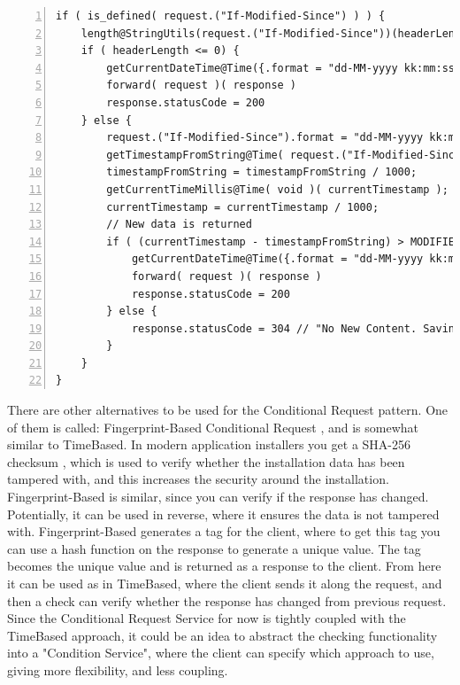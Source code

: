 \documentclass[12pt]{article}
\begin{document}
\begin{lstlisting}[caption=Courier operations for the Conditional Request service, 
    captionpos=b, label={lst:condreqCourier}, frame=single, breaklines=true, numbers=left, basicstyle=\scriptsize]
if ( is_defined( request.("If-Modified-Since") ) ) {
    length@StringUtils(request.("If-Modified-Since"))(headerLength);
    if ( headerLength <= 0) {
        getCurrentDateTime@Time({.format = "dd-MM-yyyy kk:mm:ss"})(lastModified);
        forward( request )( response )
        response.statusCode = 200
    } else {
        request.("If-Modified-Since").format = "dd-MM-yyyy kk:mm:ss";
        getTimestampFromString@Time( request.("If-Modified-Since") )( timestampFromString );
        timestampFromString = timestampFromString / 1000;
        getCurrentTimeMillis@Time( void )( currentTimestamp );
        currentTimestamp = currentTimestamp / 1000;
        // New data is returned
        if ( (currentTimestamp - timestampFromString) > MODIFIED_TIMESTAMP ) {
            getCurrentDateTime@Time({.format = "dd-MM-yyyy kk:mm:ss"})(lastModified);
            forward( request )( response )
            response.statusCode = 200
        } else {
            response.statusCode = 304 // "No New Content. Saving Bandwidth";
        }
    }
}
\end{lstlisting}

There are other alternatives to be used for the Conditional Request pattern. One of them is called: Fingerprint-Based Conditional Request \cite{CondReqRFC}, and is somewhat similar to TimeBased. In modern application installers you get a SHA-256 checksum \cite{ChecksumRFC}, which is used to verify whether the installation data has been tampered with, and this increases the security around the installation. Fingerprint-Based is similar, since you can verify if the response has changed. Potentially, it can be used in reverse, where it ensures the data is not tampered with. Fingerprint-Based generates a tag for the client, where to get this tag you can use a hash function on the response to generate a unique value. The tag becomes the unique value and is returned as a response to the client. From here it can be used as in TimeBased, where the client sends it along the request, and then a check can verify whether the response has changed from previous request. Since the Conditional Request Service for now is tightly coupled with the TimeBased approach, it could be an idea to abstract the checking functionality into a "Condition Service", where the client can specify which approach to use, giving more flexibility, and less coupling. \\
\end{document}
